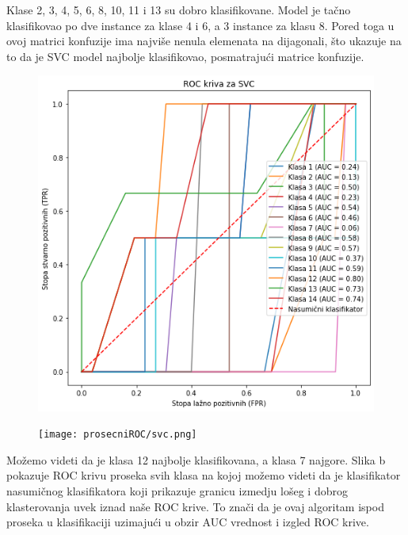 \documentclass{article}
\begin{document}
\begin{flushleft}
\begin{figure}[ht]
\begin{minipage}{0.5\textwidth}
    \end{minipage}
\end{figure}

Klase 2, 3, 4, 5, 6, 8, 10, 11 i 13 su dobro klasifikovane. Model je tačno klasifikovao po dve instance za klase 4 i 6, a 3 instance za klasu 8. Pored toga u ovoj matrici konfuzije ima najviše nenula elemenata na dijagonali, što ukazuje na to da je SVC model najbolje klasifikovao,  posmatrajući matrice konfuzije.
\end{flushleft}

\newpage



\begin{figure}[ht]
    \centering
    \begin{minipage}{0.5\textwidth}
        \centering
        \includegraphics[width=\textwidth]{svcROC.png}
        \renewcommand{\thefigure}{} 
        \captionsetup{labelformat=empty}
        \label{fig:udeo1}
    \end{minipage}\hfill
    \begin{minipage}{0.5\textwidth}
        \centering
        \texttt{[image: prosecniROC/svc.png]}
        \renewcommand{\thefigure}{} 
        \captionsetup{labelformat=empty}
        \label{fig:udeo2}
    \end{minipage}
\end{figure}
\begin{flushleft}

Možemo videti da je klasa 12 najbolje klasifikovana, a klasa 7 najgore. Slika b pokazuje ROC krivu proseka svih klasa na kojoj možemo videti da je klasifikator nasumičnog klasifikatora koji prikazuje granicu izmedju lošeg i dobrog klasterovanja uvek iznad naše ROC krive. To znači da je ovaj algoritam ispod proseka u klasifikaciji uzimajući u obzir AUC vrednost i izgled ROC krive.
\end{flushleft}
\end{document}
